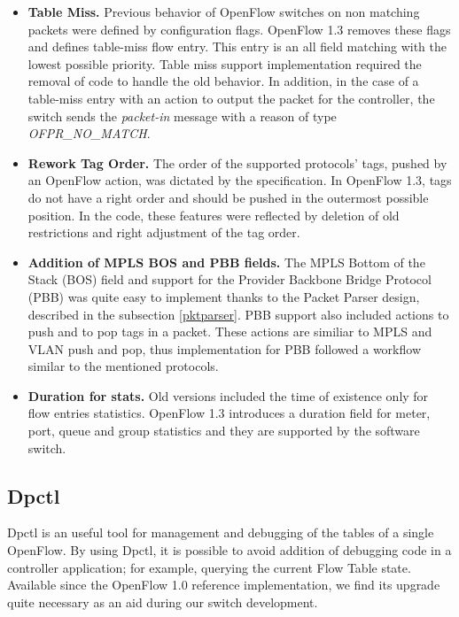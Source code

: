 \begin{itemize}
\item \textbf{Table Miss.} Previous behavior of OpenFlow switches on non matching packets were defined by configuration flags. OpenFlow 1.3 removes these flags and defines table-miss flow entry. This entry is an all field matching with the lowest possible priority. Table miss support implementation required the removal of code to handle the old behavior. In addition, in the case of a table-miss entry with an action to output the packet for the controller, the switch sends the \textit{packet-in} message with a reason of type \textit{OFPR_NO_MATCH}.      

\item \textbf{Rework Tag Order.} The order of the supported protocols' tags, pushed by an OpenFlow action, was dictated by the specification. In OpenFlow 1.3, tags do not have a right order and should be pushed in the outermost possible position. In the code, these features were reflected by deletion of old restrictions and right adjustment of the tag order. 

\item \textbf{Addition of MPLS BOS and PBB fields.} The MPLS Bottom of the Stack (BOS) field and support for the Provider Backbone Bridge Protocol (PBB) was quite easy to implement thanks to the Packet Parser design, described in the subsection \ref{pktparser}. PBB support also included actions to push and to pop tags in a packet. These actions are similiar to MPLS and VLAN push and pop, thus implementation for PBB followed a workflow similar to the mentioned protocols.  

\item \textbf{Duration for stats.} Old versions included the time of existence  only for flow entries statistics. OpenFlow 1.3 introduces a duration field for meter, port, queue and group statistics and they are supported by the software switch.  

\end{itemize}

\subsection{Dpctl}
\label{sec:sec47}

Dpctl is an useful tool for management and debugging of the tables of a single OpenFlow. By using Dpctl, it is possible to avoid addition of debugging code in a controller application; for example, querying the current Flow Table state. Available since the OpenFlow 1.0 reference implementation, we find its upgrade quite necessary as an aid during our switch development. 

